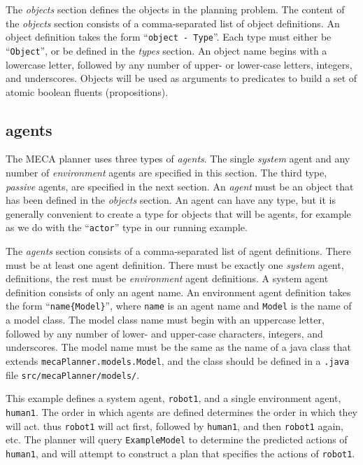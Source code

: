 \documentclass{article}
\begin{document}
The \emph{objects} section defines the objects in the planning problem.
The content of the \emph{objects} section consists of a comma-separated list of
object definitions. An object definition takes the form ``\texttt{object -
Type}''. Each type must
either be ``\texttt{Object}'', or be defined in the \emph{types} section.  An
object name begins with a lowercase letter, followed by any number of upper-
or lower-case letters, integers, and underscores.
Objects will be used as arguments to predicates to build a set of atomic
boolean fluents (propositions).


\subsection{agents}

The MECA planner uses three types of \emph{agents}. The single
\emph{system} agent and any number of \emph{environment} agents are specified in
this section.  The third type, \emph{passive} agents, are specified in the next
section. 
An \emph{agent} must be an object that has been defined in the
\emph{objects} section. An agent can have any type, but it is generally
convenient to create a type for objects that will be agents, for example 
as we do with the ``\texttt{actor}'' type in our running example.

The \emph{agents} section consists of a comma-separated list of agent
definitions. There must be at least one agent definition. There must be exactly
one \emph{system} agent, definitions, the rest must be \emph{environment} agent
definitions. A system agent definition consists of only an agent name.
An environment
agent definition takes the form ``\texttt{name\{Model\}}'', where \texttt{name}
is an agent name and \texttt{Model} is the name of a model class. The model
class name must begin with an uppercase letter, followed by any number of
lower- and upper-case characters, integers, and underscores. The model name must
be the same as the name of a java class that extends
\texttt{mecaPlanner.models.Model}, and the class should be defined in a
\texttt{.java} file \texttt{src/mecaPlanner/models/}.

This example defines a system agent, \texttt{robot1}, and a single environment
agent, \texttt{human1}.
The order in which agents are defined determines the order in which they will
act. thus \texttt{robot1} will act first, followed by
\texttt{human1}, and then \texttt{robot1} again, etc. The planner will query
\texttt{ExampleModel} to determine the predicted actions of \texttt{human1}, and
will attempt to construct a plan that specifies the actions of \texttt{robot1}.
\end{document}
